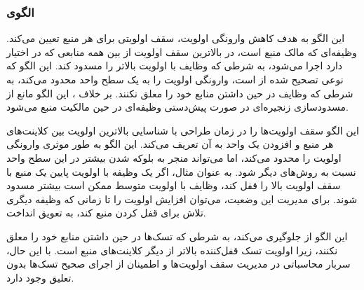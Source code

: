 \subsubsection{الگوی }
\label{resourceHighestLockerSec}
\begin{RTL}
این الگو \cite{ref4}
به هدف کاهش وارونگی اولویت، سقف اولویتی برای هر منبع تعیین می‌کند.
وظیفه‌ای که مالک منبع است، در بالاترین سقف اولویت از بین همه
منابعی که در اختیار دارد اجرا می‌شود، به شرطی که وظایف
با اولویت بالاتر را مسدود کند. این الگو که نوعی تصحیح شده از
 است، وارونگی اولویت را به یک سطح
واحد محدود می‌کند، به شرطی که وظایف در حین داشتن منابع خود را معلق نکنند.
بر خلاف ، این الگو مانع از مسدودسازی
زنجیره‌ای در صورت پیش‌دستی وظیفه‌ای در حین مالکیت منبع می‌شود.
\end{RTL}
\begin{RTL}
این الگو سقف اولویت‌ها را در زمان طراحی با شناسایی بالاترین اولویت
بین کلاینت‌های هر منبع و افزودن یک واحد به آن تعریف می‌کند.
این الگو به طور موثری وارونگی اولویت را محدود می‌کند، اما می‌تواند منجر
به بلوکه شدن بیشتر در این سطح واحد نسبت به روش‌های دیگر شود.
به عنوان مثال، اگر یک وظیفه با اولویت پایین یک منبع با سقف اولویت بالا
را قفل کند، وظایف با اولویت متوسط ممکن است بیشتر مسدود شوند.
برای مدیریت این وضعیت، می‌توان افزایش اولویت را تا زمانی که
وظیفه دیگری تلاش برای قفل کردن منبع کند، به تعویق انداخت.
\end{RTL}
\begin{RTL}
این الگو از  جلوگیری می‌کند،
به شرطی که تسک‌ها در حین داشتن منابع خود را معلق نکنند،
زیرا اولویت تسک قفل‌کننده بالاتر از دیگر کلاینت‌های منبع است.
با این حال، سربار محاسباتی در مدیریت سقف اولویت‌ها
و اطمینان از اجرای صحیح تسک‌ها بدون تعلیق وجود دارد.
\end{RTL}